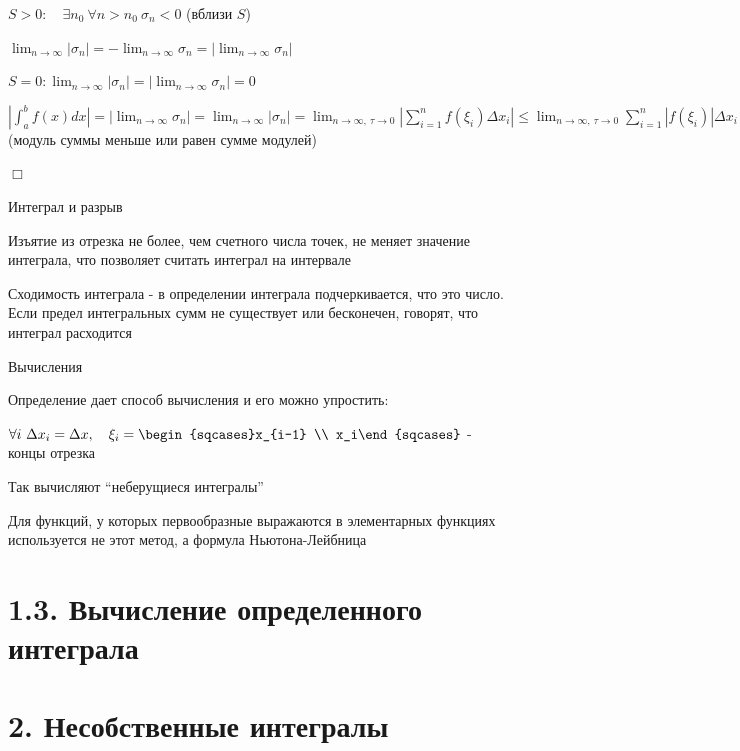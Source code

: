 \documentclass[12pt]{article}
\begin{document}
\begin{enumerate}
        $S > 0: \quad \exists n_0 \ \forall n > n_0 \ \sigma_n < 0$ (вблизи $S$)

        $\lim_{n\to\infty} |\sigma_n| = -\lim_{n\to\infty} \sigma_n = |\lim_{n\to\infty} \sigma_n|$

        $S = 0: \lim_{n\to\infty} |\sigma_n| = |\lim_{n\to\infty} \sigma_n| = 0$

        $\left| \int^b_a f(x)dx \left| = |\lim_{n\to\infty} \sigma_n| = \lim_{n\to\infty} |\sigma_n| =
        \lim_{n\to\infty,\ \tau\to0} \left|\sum_{i=1}^n f(\xi_i) \Delta x_i\right| \leq \lim_{n\to\infty,\ \tau\to0} \sum_{i=1}^n |f(\xi_i)| \Delta x_i$ (модуль суммы меньше или равен сумме модулей)

        $\Box$

    \end{enumerate}

    \Nota Интеграл и разрыв

    Изъятие из отрезка не более, чем счетного числа точек, не меняет значение интеграла, что позволяет считать интеграл на интервале

    \Nota Сходимость интеграла - в определении интеграла подчеркивается, что это число.
    Если предел интегральных сумм не существует или бесконечен, говорят, что интеграл расходится

    \Nota Вычисления

    Определение дает способ вычисления и его можно упростить:

    $\forall i\ \Delta x_i = \Delta x, \quad \xi_i = \begin{sqcases}x_{i-1} \\ x_i\end{sqcases}$ - концы отрезка

    Так вычисляют \enquote{неберущиеся интегралы}

    Для функций, у которых первообразные выражаются в элементарных функциях используется не этот метод, а формула Ньютона-Лейбница

    \section{1.3. Вычисление определенного интеграла}







    \clearpage

    \section{2. Несобственные интегралы}
\end{document}

